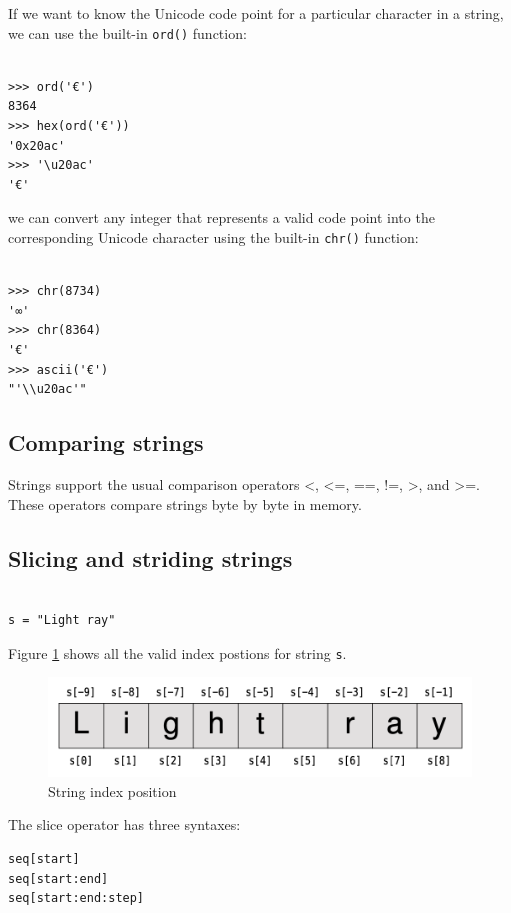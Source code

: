 If we want to know the Unicode code point for a particular character in a string, we can use the built-in \verb|ord()| function:
\begin{lstlisting}

>>> ord('€')
8364
>>> hex(ord('€'))
'0x20ac'
>>> '\u20ac'
'€'
\end{lstlisting}


we can convert any integer that represents a valid code point into the corresponding Unicode character using the built-in \verb|chr()| function:

\begin{lstlisting}

>>> chr(8734)
'∞'
>>> chr(8364)
'€'
>>> ascii('€')
"'\\u20ac'"
\end{lstlisting}



\subsection{Comparing strings}

Strings support the usual comparison operators <, <=, ==, !=, >, and >=.
These operators compare strings byte by byte in memory.

\subsection{Slicing and striding strings}

\begin{lstlisting}

s = "Light ray"
\end{lstlisting}

Figure \ref{fig:string-index-position} shows all the valid index postions for string \verb|s|.

\begin{figure}[!ht]
  \centering
  \includegraphics[width=\textwidth]{pics/string-index-position}
  \caption{String index position}
  \label{fig:string-index-position}
\end{figure}

The slice operator has three syntaxes:
\begin{verbatim}
seq[start]
seq[start:end]
seq[start:end:step]
\end{verbatim}


